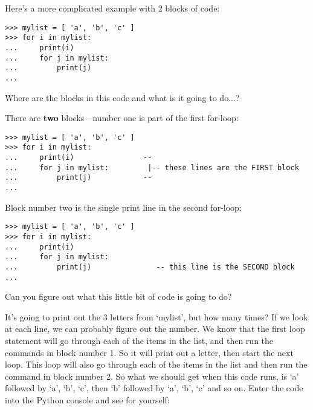 
\par
Here's a more complicated example with 2 blocks of code:

\begin{listing}
\begin{verbatim}
>>> mylist = [ 'a', 'b', 'c' ]
>>> for i in mylist:
...     print(i)
...     for j in mylist:
...         print(j)
...
\end{verbatim}
\end{listing}

\noindent
Where are the blocks in this code and what is it going to do...?
\par
\noindent
There are \textbf{two} blocks---number one is part of the first for-loop:

\begin{listing}
\begin{verbatim}
>>> mylist = [ 'a', 'b', 'c' ]
>>> for i in mylist:
...     print(i)                --
...     for j in mylist:         |-- these lines are the FIRST block
...         print(j)            --
...
\end{verbatim}
\end{listing}

Block number two is the single print line in the second for-loop:

\begin{listing}
\begin{verbatim}
>>> mylist = [ 'a', 'b', 'c' ]
>>> for i in mylist:
...     print(i)
...     for j in mylist:
...         print(j)               -- this line is the SECOND block
...
\end{verbatim}
\end{listing}

Can you figure out what this little bit of code is going to do?
\par
It's going to print out the 3 letters from `mylist', but how many times?  If we look at each line, we can probably figure out the number. We know that the first loop statement will go through each of the items in the list, and then run the commands in block number 1. So it will print out a letter, then start the next loop. This loop will also go through each of the items in the list and then run the command in block number 2.  So what we should get when this code runs, is `a' followed by `a', `b', `c', then `b' followed by `a', `b', `c' and so on. Enter the code into the Python console and see for yourself:

